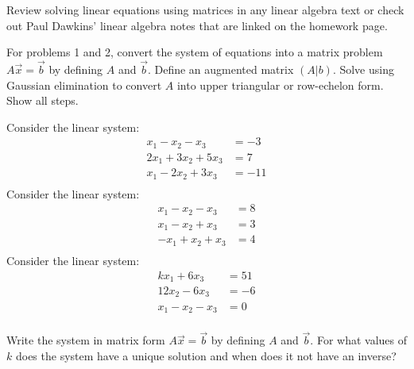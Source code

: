 \documentclass[
	number={1},
	title={Review of Matrices}
]{math486homework}
\begin{document}
\maketitle

\noindent Review solving linear equations using matrices in any linear algebra text or check out Paul Dawkins' linear algebra notes that are linked on the homework page.

For problems 1 and 2, convert the system of equations into a matrix problem $A\vec{x}=\vec{b}$ by defining $A$ and $\vec{b}$.
Define an augmented matrix $(A|b)$.
Solve using Gaussian elimination to convert $A$ into upper triangular or row-echelon form.
Show all steps.

\begin{problems}
	\problem Consider the linear system:
	\begin{equation*}
	\begin{aligned}
		 x_{1} -  x_{2} -  x_{3} &= -3\\
		2x_{1} + 3x_{2} + 5x_{3} &= 7\\
		 x_{1} - 2x_{2} + 3x_{3} &= -11\\
	\end{aligned}
	\end{equation*}
	\problem Consider the linear system:
	\begin{equation*}
	\begin{aligned}
		 x_{1} - x_{2} - x_{3} &= 8\\
		 x_{1} - x_{2} + x_{3} &= 3\\
		-x_{1} + x_{2} + x_{3} &= 4\\
	\end{aligned}
	\end{equation*}
	\problem Consider the linear system:
	\begin{equation*}
	\begin{aligned}
		kx_{1} + 6x_{3} &= 51\\
		12x_{2} - 6x_{3} &= -6\\
		x_{1} - x_{2} - x_{3} &= 0\\
	\end{aligned}
	\end{equation*}
	\begin{problems}
		\subproblem Write the system in matrix form $A\vec{x}=\vec{b}$ by defining $A$ and $\vec{b}$. 
		\subproblem For what values of $k$ does the system have a unique solution and when does it not have an inverse? 
	\end{problems}

\end{problems}
\end{document}
